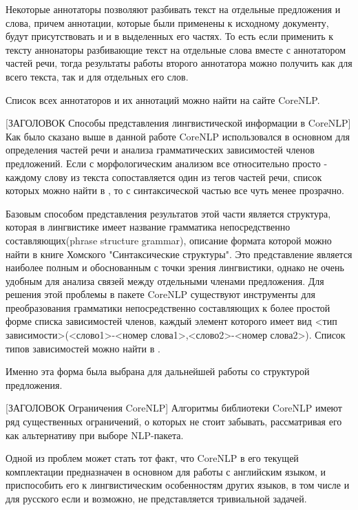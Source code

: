 Некоторые аннотаторы позволяют разбивать текст на отдельные предложения и слова,
причем аннотации, которые были применены к исходному документу, будут присутствовать и
и в выделенных его частях. 
То есть если применить к тексту аннонаторы разбивающие текст на отдельные слова
вместе с аннотатором частей речи, тогда результаты работы второго аннотатора
можно получить как для всего текста, так и для отдельных его слов.

Список всех аннотаторов и их аннотаций можно найти на сайте CoreNLP\cite{corenlp}.

[ЗАГОЛОВОК Способы представления лингвистической информации в CoreNLP]
Как было сказано выше в данной работе CoreNLP использовался в основном для 
определения частей речи и анализа грамматических зависимостей
членов предложений.
Если с морфологическим анализом все относительно просто - каждому слову
из текста сопоставляется один из тегов частей речи, список которых можно найти в \cite{treebank},
то с синтаксической частью все чуть менее прозрачно.

Базовым способом представления результатов этой части является структура,
которая в лингвистике имеет название грамматика непосредственно составляющих(phrase structure grammar), 
описание формата которой можно найти в книге Хомского "Синтаксические структуры"\cite{homsky}.
Это представление является наиболее полным и обоснованным с точки зрения лингвистики, 
однако не очень удобным для анализа связей между отдельными членами предложения.
Для решения этой проблемы в пакете CoreNLP существуют инструменты для 
преобразования грамматики непосредственно составляющих к более простой форме
списка зависимостей членов, каждый элемент которого имеет вид 
<тип зависимости>(<слово1>-<номер слова1>,<слово2>-<номер слова2>).
Список типов зависимостей можно найти в \cite{dependencies}.

Именно эта форма была выбрана для дальнейшей работы со структурой
предложения.


[ЗАГОЛОВОК Ограничения CoreNLP]
Алгоритмы библиотеки CoreNLP имеют ряд существенных ограничений, 
о которых не стоит забывать, рассматривая его как альтернативу
при выборе NLP-пакета.

Одной из проблем может стать тот факт, что CoreNLP в его текущей комплектации
предназначен в основном для работы с английским языком, 
и приспособить его к лингвистическим особенностям других языков, в том числе и для русского
если и возможно, не представляется тривиальной задачей.

